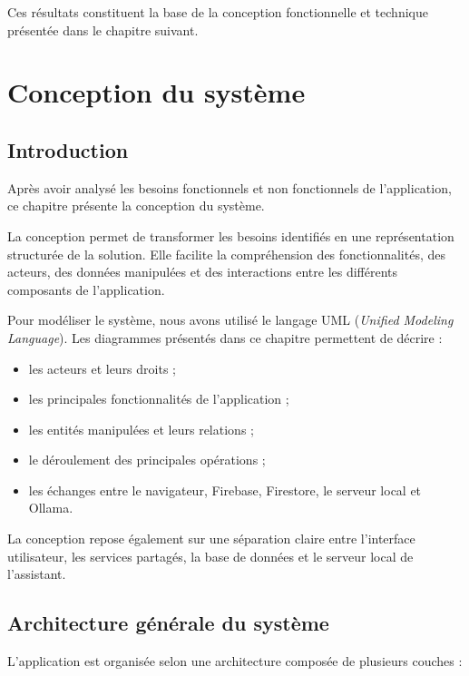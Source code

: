 \documentclass{rapportENSIAS}
\begin{document}
Ces résultats constituent la base de la conception fonctionnelle et technique présentée dans le chapitre suivant.


\chapter{Conception du système}

\section{Introduction}

Après avoir analysé les besoins fonctionnels et non fonctionnels de l’application, ce chapitre présente la conception du système.

La conception permet de transformer les besoins identifiés en une représentation structurée de la solution. Elle facilite la compréhension des fonctionnalités, des acteurs, des données manipulées et des interactions entre les différents composants de l’application.

Pour modéliser le système, nous avons utilisé le langage UML (\textit{Unified Modeling Language}). Les diagrammes présentés dans ce chapitre permettent de décrire :

\begin{itemize}
    \item les acteurs et leurs droits ;
    \item les principales fonctionnalités de l’application ;
    \item les entités manipulées et leurs relations ;
    \item le déroulement des principales opérations ;
    \item les échanges entre le navigateur, Firebase, Firestore, le serveur local et Ollama.
\end{itemize}

La conception repose également sur une séparation claire entre l’interface utilisateur, les services partagés, la base de données et le serveur local de l’assistant.

\section{Architecture générale du système}

L’application est organisée selon une architecture composée de plusieurs couches :
\end{document}
